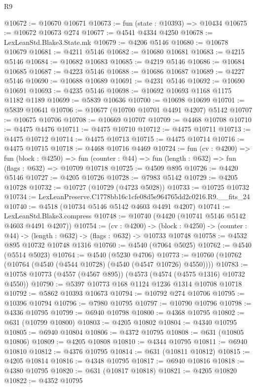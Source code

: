 \begin{lexlean}{R9}
\begin{coremodule}
@10672 := @10670 @10671
@10673 := fun (state : @10393) => @10434
@10675 := @10672 @10673 @274
@10677 := @4541 @4334 @4250
@10678 := LexLeanStd.Blake3.State.mk
@10679 := @4206 @5146
@10680 := @10678 @10679
@10681 := @4211 @5146
@10682 := @10680 @10681
@10683 := @4215 @5146
@10684 := @10682 @10683
@10685 := @4219 @5146
@10686 := @10684 @10685
@10687 := @4223 @5146
@10688 := @10686 @10687
@10689 := @4227 @5146
@10690 := @10688 @10689
@10691 := @4231 @5146
@10692 := @10690 @10691
@10693 := @4235 @5146
@10698 := @10692 @10693 @1168 @1175 @1182 @1189
@10699 := @5839 @10636
@10700 := @10698 @10699
@10701 := @5839 @10641
@10706 := @10677 (@10700 @10701 @4491 @4207) @5142
@10707 := @10675 @10706
@10708 := @10669 @10707
@10709 := @4468 @10708
@10710 := @4475 @4476
@10711 := @4475 @10710
@10712 := @4475 @10711
@10713 := @4475 @10712
@10714 := @4475 @10713
@10715 := @4475 @10714
@10716 := @4475 @10715
@10718 := @4468 @10716 @4469
@10724 := fun (cv : @4200) =>
  fun (block : @4250) =>
  fun (counter : @44) => fun (length : @632) => fun (flags : @632) => @10709 @10718
@10725 := @4509 @895
@10726 := @4420 @5146
@10727 := @4205 @10726
@10728 := @7983 @5142
@10729 := @4205 @10728
@10732 := @10727 (@10729 (@4723 @5028))
@10733 := @10725 @10732
@10734 := LexLeanPreserve.C1778bb16c1cfe08d5e964765dd2c0216.R9.__fits_24
@10740 := @4518 (@10734 @5146 @5142 @4603 @4491 @4207)
@10741 := LexLeanStd.Blake3.compress
@10748 := @10740 (@4420 (@10741 @5146 @5142 @4603 @4491 @4207))
@10754 := (cv : @4200) ->
  (block : @4250) -> (counter : @44) -> (length : @632) -> (flags : @632) -> @10733 @10748
@10758 := @4532 @895 @10732 @10748 @1316
@10760 := @4540 (@7064 @5025)
@10762 := @4540 (@5514 @5023)
@10764 := @4540 (@5230 @4706)
@10773 := @10760 (@10762 (@10764 (@4540 (@4544 @10728) (@4540 (@4547 @10726) @4550))))
@10783 := @10758 @10773 (@4557 (@4567 @895)) (@4573 (@4574 (@4575 @1316) @10732 @4550))
@10790 := @5397 @10773 @168 @1124 @1236 @1314 @10708 @10718
@10792 := @5862 @10393 @10673
@10794 := @10792 @274 @10706
@10795 := @10396 @10794
@10796 := @7980 @10795
@10797 := @10790 @10796
@10798 := @4336 @10795
@10799 := @6940 @10798
@10800 := @4368 @10795
@10802 := @631 (@10799 @10800)
@10803 := @4205 @10802
@10804 := @4340 @10795
@10805 := @6940 @10804
@10806 := @4372 @10795
@10808 := @631 (@10805 @10806)
@10809 := @4205 @10808
@10810 := @4344 @10795
@10811 := @6940 @10810
@10812 := @4376 @10795
@10814 := @631 (@10811 @10812)
@10815 := @4205 @10814
@10816 := @4348 @10795
@10817 := @6940 @10816
@10818 := @4380 @10795
@10820 := @631 (@10817 @10818)
@10821 := @4205 @10820
@10822 := @4352 @10795

\end{coremodule}
\end{lexlean}
